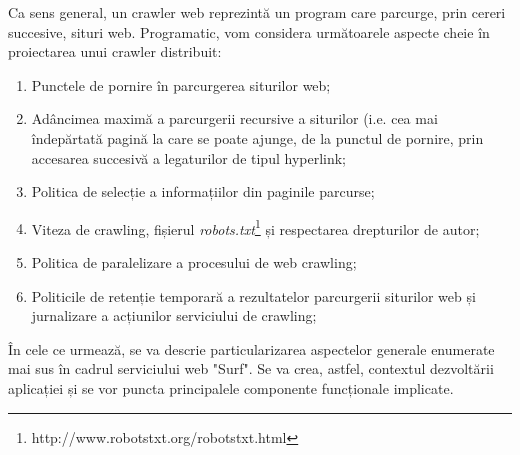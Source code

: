 \newcommand{\robotsTxtDescription}{http://www.robotstxt.org/robotstxt.html}

Ca sens general, un crawler web reprezintă un program care parcurge, prin cereri succesive, situri web. Programatic, vom considera următoarele aspecte cheie în proiectarea unui crawler distribuit:

\begin{enumerate}

	\item{Punctele de pornire în parcurgerea siturilor web;}
	
	\item{Adâncimea maximă a parcurgerii recursive a siturilor (i.e. cea mai îndepărtată pagină la care se poate ajunge, de la punctul de pornire, prin accesarea succesivă a legaturilor de tipul hyperlink;}
	
	\item{Politica de selecție a informațiilor din paginile parcurse\cite{web-crawler-selection-policy};}
	
	\item{Viteza de crawling, fișierul \emph{robots.txt}\footnote{\robotsTxtDescription} și respectarea drepturilor de autor;}
	
	\item{Politica de paralelizare a procesului de web crawling;}
	
	\item{Politicile de retenție temporară a rezultatelor parcurgerii siturilor web și jurnalizare a acțiunilor serviciului de crawling;}
	
\end{enumerate}

În cele ce urmează, se va descrie particularizarea aspectelor generale enumerate mai sus în cadrul serviciului web "Surf". Se va crea, astfel, contextul dezvoltării aplicației și se vor puncta principalele componente funcționale implicate.
